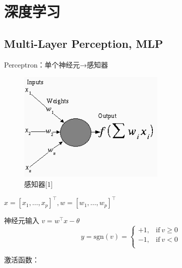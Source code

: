 \documentclass[openany]{ctexbook}
\theoremstyle{kaiti}
\theoremstyle{normal}
\begin{document}
\chapter{深度学习}

\section{Multi-Layer Perception, MLP}

Perceptron：单个神经元→感知器

\begin{figure}
  \centering
  \includegraphics[width=7cm]{1627808551310-8.1.png}
  \caption{感知器[1]}
\end{figure}

$x=\left[x_1,\dots ,x_p \right] ^{\top}, w=\left[w_1,\dots ,w_p \right] ^{\top}$

神经元输入 $v=w^{\top}x-\theta$
\begin{equation}
  y=\mathrm{sgn}(v)=
  \begin{cases}
    +1, &\mathrm{if}~v\geqslant 0\\
    -1, &\mathrm{if}~v< 0\\
  \end{cases}
\end{equation}

激活函数：
\end{document}
